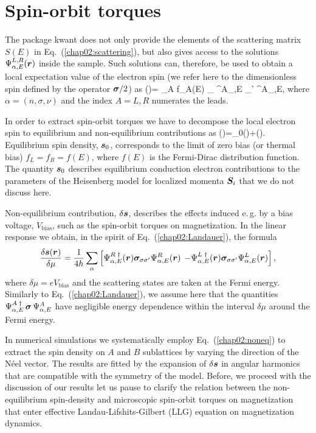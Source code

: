 \section{Spin-orbit torques}

The package kwant \cite{groth_kwant:_2014} does not only provide the elements of the scattering matrix $S(E)$ in Eq.~(\ref{chap02:scattering}), but also gives access to the solutions $\Psi^{L,R}_{\alpha,E}(\boldsymbol{r})$ inside the sample. Such solutions can, therefore, be used to obtain a local expectation value of the electron spin (we refer here to the dimensionless spin defined by the operator $\boldsymbol{\sigma}/2$) as
\be
\label{chap02:sdensity}
()= \int {} \s_\textrm{A} f_A(E)  \sum_{\alpha}  \Psi^{A\;\dagger}_{\alpha,E} \bb{\sigma}_{\sigma\sigma'} \Psi^{A}_{\alpha,E}, 
 \e
where $\alpha=(n,\sigma,\nu)$ and the index $A=L,R$ numerates the leads. 

In order to extract spin-orbit torques we have to decompose the local electron spin to equilibrium and non-equilibrium contributions as
\be
{}()=_0()+\delta{}().
\e
Equilibrium spin density, $\boldsymbol{s}_0$, corresponds to the limit of zero bias (or thermal bias) $f_L=f_R=f(E)$, where $f(E)$ is the Fermi-Dirac distribution function.  The quantity $\boldsymbol{s}_0$ describes equilibrium conduction electron contributions to the parameters of the Heisenberg model for localized momenta $\boldsymbol{S}_i$ that we do not discuss here. 

Non-equilibrium contribution, $\delta\boldsymbol{s}$, describes the effects induced e.\,g. by a bias voltage, $V_\textrm{bias}$, such as the spin-orbit torques on magnetization. In the linear response we obtain, in the spirit of Eq.~(\ref{chap02:Landauer}), the formula
\begin{align}
\frac{\delta\boldsymbol{s}(\boldsymbol{r})}{\delta\mu} =  \frac{1}{4h} \sum_{\alpha}  \left[\Psi^{R\;\dagger}_{\alpha,E}(\boldsymbol{r}) \boldsymbol{\sigma}_{\sigma\sigma'} \Psi^{R}_{\alpha,E}(\boldsymbol{r}) \right.  \left. - \Psi^{L\;\dagger}_{\alpha,E}(\boldsymbol{r}) \boldsymbol{\sigma}_{\sigma\sigma'} \Psi^{L}_{\alpha,E}(\boldsymbol{r}) \right],
\label{chap02:noneq}
\end{align}
where $\delta\mu=eV_\textrm{bias}$ and the scattering states are taken at the Fermi energy.  Similarly to Eq.~(\ref{chap02:Landauer}), we assume here that the quantities $\Psi^{A\;\dagger}_{\alpha,E} \,\boldsymbol{\sigma}\, \Psi^{A}_{\alpha,E}$  have negligible energy dependence within the interval $\delta\mu$ around the Fermi energy. 

In numerical simulations we systematically employ Eq.~(\ref{chap02:noneq}) to extract the spin density on $A$ and $B$ sublattices by varying the direction of the N\'eel vector. The results are fitted by the expansion of $\delta\boldsymbol{s}$ in angular harmonics that are compatible with the symmetry of the model. Before, we proceed with the discussion of our results let us pause to clarify the relation between the non-equilibrium spin-density and microscopic spin-orbit torques on magnetization that enter effective Landau-Lifshits-Gilbert (LLG) equation on magnetization dynamics.

